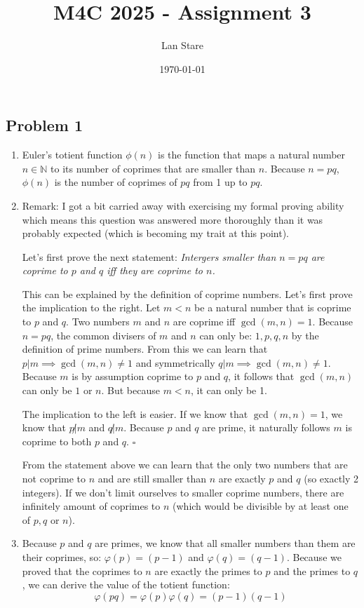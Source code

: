 \documentclass[a4paper,10pt]{article}
\title{M4C 2025 \--  Assignment 3}
\author{Lan Stare}
\date{\today}
\begin{document}
\maketitle

\subsection*{Problem 1}
 
\begin{enumerate}[label= (\alph*)]

 \item Euler's totient function $\phi(n)$ is the function that maps a natural number $n \in \mathbb{N}$ to its number of coprimes that are smaller than $n$. Because $n = p q$, $\phi(n)$ is the number of coprimes of $p q$ from 1 up to $p q$.
 \item Remark: I got a bit carried away with exercising my formal proving ability which means this question was answered more thoroughly than it was probably expected (which is becoming my trait at this point).
 
 Let's first prove the next statement: \textit{Intergers smaller than $n = p q$ are coprime to $p$ and $q$ iff they are coprime to $n$.}
 
 This can be explained by the definition of coprime numbers. Let's first prove the implication to the right. Let $m < n$ be a natural number that is coprime to $p$ and $q$. Two numbers $m$ and $n$ are coprime iff $\gcd(m, n) = 1$. Because $n = p q$, the common divisers of $m$ and $n$ can only be: $1, p, q, n$ by the definition of prime numbers. From this we can learn that $p | m \implies \gcd(m, n) \neq 1$ and symmetrically $q | m \implies \gcd(m, n) \neq 1$. Because $m$ is by assumption coprime to $p$ and $q$, it follows that $\gcd(m, n)$ can only be $1$ or $n$. But because $m < n$, it can only be 1.

 The implication to the left is easier. If we know that $\gcd(m, n) = 1$, we know that $p \not| m$ and $q \not| m$. Because $p$ and $q$ are prime, it naturally follows $m$ is coprime to both $p$ and $q$. $\square$

 From the statement above we can learn that the only two numbers that are not coprime to $n$ and are still smaller than $n$ are exactly $p$ and $q$ (so exactly 2 integers). If we don't limit ourselves to smaller coprime numbers, there are infinitely amount of coprimes to $n$ (which would be divisible by at least one of $p, q$ or $n$).
 
\item  Because $p$ and $q$ are primes, we know that all smaller numbers than them are their coprimes, so: $\varphi(p) = (p - 1)$ and $\varphi(q) = (q - 1)$. Because we proved that the coprimes to $n$ are exactly the primes to $p$ and the primes to $q$, we can derive the value of the totient function: \[\varphi(p q) = \varphi(p) \varphi(q) = (p - 1)(q - 1)\]

\end{enumerate}
\end{document}
